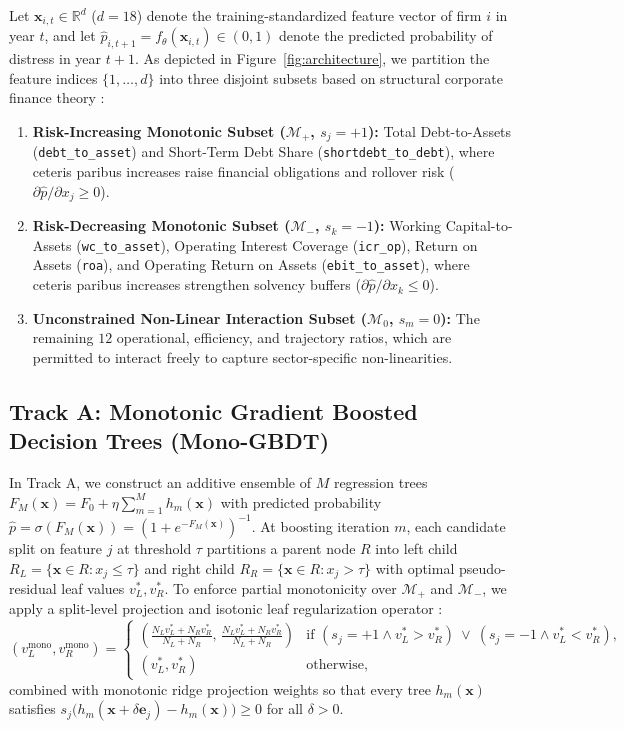 \documentclass[11pt,a4paper]{article}
\begin{document}
Let $\mathbf{x}_{i,t} \in \mathbb{R}^d$ ($d=18$) denote the training-standardized feature vector of firm $i$ in year $t$, and let $\hat{p}_{i,t+1} = f_\theta(\mathbf{x}_{i,t}) \in (0,1)$ denote the predicted probability of distress in year $t+1$. As depicted in Figure~\ref{fig:architecture}, we partition the feature indices $\{1,\dots,d\}$ into three disjoint subsets based on structural corporate finance theory \citep{merton1974pricing,altman1968financial}:
\begin{enumerate}
    \item \textbf{Risk-Increasing Monotonic Subset ($\mathcal{M}_+$, $s_j = +1$):} Total Debt-to-Assets (\texttt{debt\_to\_asset}) and Short-Term Debt Share (\texttt{shortdebt\_to\_debt}), where ceteris paribus increases raise financial obligations and rollover risk ($\partial \hat{p} / \partial x_j \ge 0$).
    \item \textbf{Risk-Decreasing Monotonic Subset ($\mathcal{M}_-$, $s_k = -1$):} Working Capital-to-Assets (\texttt{wc\_to\_asset}), Operating Interest Coverage (\texttt{icr\_op}), Return on Assets (\texttt{roa}), and Operating Return on Assets (\texttt{ebit\_to\_asset}), where ceteris paribus increases strengthen solvency buffers ($\partial \hat{p} / \partial x_k \le 0$).
    \item \textbf{Unconstrained Non-Linear Interaction Subset ($\mathcal{M}_0$, $s_m = 0$):} The remaining $12$ operational, efficiency, and trajectory ratios, which are permitted to interact freely to capture sector-specific non-linearities.
\end{enumerate}

\subsection{Track A: Monotonic Gradient Boosted Decision Trees (Mono-GBDT)}
In Track A, we construct an additive ensemble of $M$ regression trees $F_M(\mathbf{x}) = F_0 + \eta \sum_{m=1}^M h_m(\mathbf{x})$ with predicted probability $\hat{p} = \sigma(F_M(\mathbf{x})) = (1 + e^{-F_M(\mathbf{x})})^{-1}$. At boosting iteration $m$, each candidate split on feature $j$ at threshold $\tau$ partitions a parent node $R$ into left child $R_L = \{\mathbf{x} \in R : x_j \le \tau\}$ and right child $R_R = \{\mathbf{x} \in R : x_j > \tau\}$ with optimal pseudo-residual leaf values $v_L^*, v_R^*$. To enforce partial monotonicity over $\mathcal{M}_+$ and $\mathcal{M}_-$, we apply a split-level projection and isotonic leaf regularization operator \citep{chen2016xgboost,ke2017lightgbm}:
\begin{equation}
    (v_L^{\text{mono}}, v_R^{\text{mono}}) = \begin{cases}
        \left(\frac{N_L v_L^* + N_R v_R^*}{N_L + N_R}, \, \frac{N_L v_L^* + N_R v_R^*}{N_L + N_R}\right) & \text{if } (s_j = +1 \wedge v_L^* > v_R^*) \ \vee \ (s_j = -1 \wedge v_L^* < v_R^*), \\[6pt]
        (v_L^*, v_R^*) & \text{otherwise},
    \end{cases}
\end{equation}
combined with monotonic ridge projection weights so that every tree $h_m(\mathbf{x})$ satisfies $s_j \big(h_m(\mathbf{x} + \delta \mathbf{e}_j) - h_m(\mathbf{x})\big) \ge 0$ for all $\delta > 0$.
\end{document}
